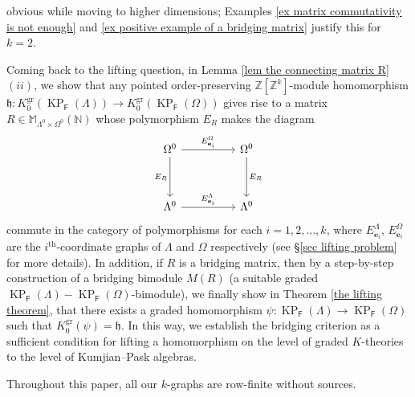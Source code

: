 \documentclass[12pt]{amsart}
\newcommand{\ZZ}{\mathbb{Z}}
\newcommand{\KP}{\operatorname{KP}}
\theoremstyle{definition}
\theoremstyle{remark}
\newcommand{\gr}{\operatorname{gr}}
\begin{document}
obvious while moving to higher dimensions; Examples \ref{ex matrix commutativity is not enough} and \ref{ex positive example of a bridging matrix} justify this for $k=2$. 

Coming back to the lifting question, in Lemma \ref{lem the connecting matrix R} $(ii)$, we show that any pointed order-preserving $\ZZ[\ZZ^k]$-module homomorphism $\mathfrak{h}:K_0^{\gr}(\KP_\mathsf{F}(\Lambda))\longrightarrow K_0^{\gr}(\KP_\mathsf{F}(\Omega))$ gives rise to a matrix $R\in \mathbb{M}_{\Lambda^0\times \Omega^0}(\mathbb{N})$ whose polymorphism $E_R$ makes the diagram
\begin{equation*}\label{comd0}
\begin{tikzcd}[row sep=huge, column sep=huge]
		\Omega^0 \arrow [r, "E_{\mathbf{e}_i}^\Omega"] \arrow [d, "E_R"'] & \Omega^0 \arrow [d, "E_R"] \\
		\Lambda^0 \arrow [r, "E_{\mathbf{e}_i}^\Lambda"] & \Lambda^0
\end{tikzcd}    
\end{equation*}
commute in the category of polymorphisms for each $i=1,2,\ldots,k$, where $E_{\mathbf{e}_i}^\Lambda$, $E_{\mathbf{e}_i}^\Omega$ are the $i^{\text{th}}$-coordinate graphs of $\Lambda$ and $\Omega$ respectively (see \S \ref{sec lifting problem} for more details). In addition, if $R$ is a bridging matrix, then by a step-by-step construction of a bridging bimodule $M(R)$ (a suitable graded $\KP_\mathsf{F}(\Lambda)-\KP_\mathsf{F}(\Omega)$-bimodule), we finally show in Theorem \ref{the lifting theorem}, that there exists a graded homomorphism $\psi:\KP_\mathsf{F}(\Lambda)\longrightarrow \KP_\mathsf{F}(\Omega)$ such that $K_0^{\gr}(\psi)=\mathfrak{h}$. In this way, we establish the bridging criterion as a sufficient condition for lifting a homomorphism on the level of graded $K$-theories to the level of Kumjian--Pask algebras.  

Throughout this paper, all our $k$-graphs are row-finite without sources.
\end{document}
